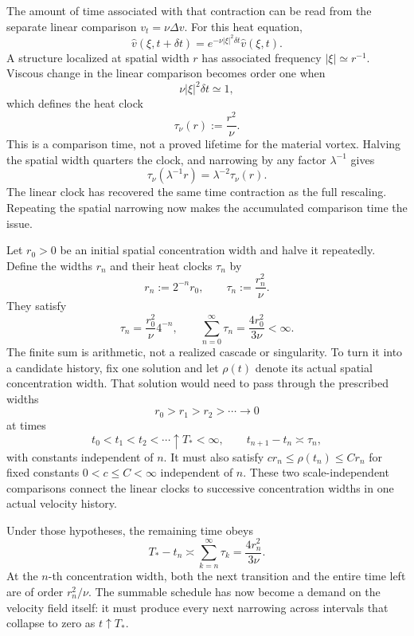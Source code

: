 
The amount of time associated with that contraction can be read from the separate linear comparison \(v_t=\nu\Delta v\). For this heat equation,
\[
  \widehat v(\xi,t+\delta t)
  =
  e^{-\nu|\xi|^2\delta t}\widehat v(\xi,t).
\]
A structure localized at spatial width \(r\) has associated frequency \(|\xi|\simeq r^{-1}\). Viscous change in the linear comparison becomes order one when
\[
  \nu|\xi|^2\delta t\simeq1,
\]
which defines the heat clock
\[
  \tau_\nu(r)
  :=
  \frac{r^2}{\nu}.
\]
This is a comparison time, not a proved lifetime for the material vortex. Halving the spatial width quarters the clock, and narrowing by any factor \(\lambda^{-1}\) gives
\[
  \tau_\nu(\lambda^{-1}r)
  =
  \lambda^{-2}\tau_\nu(r).
\]
The linear clock has recovered the same time contraction as the full \NavierStokes{} rescaling. Repeating the spatial narrowing now makes the accumulated comparison time the issue.


Let \(r_0>0\) be an initial spatial concentration width and halve it repeatedly. Define the widths \(r_n\) and their heat clocks \(\tau_n\) by
\[
  r_n:=2^{-n}r_0,
  \qquad
  \tau_n:=\frac{r_n^2}{\nu}.
\]
They satisfy
\[
  \tau_n
  =
  \frac{r_0^2}{\nu}4^{-n},
  \qquad
  \sum_{n=0}^{\infty}\tau_n
  =
  \frac{4r_0^2}{3\nu}
  <
  \infty.
\]
The finite sum is arithmetic, not a realized cascade or singularity. To turn it into a candidate history, fix one \NavierStokes{} solution and let \(\rho(t)\) denote its actual spatial concentration width. That solution would need to pass through the prescribed widths
\[
  r_0>r_1>r_2>\cdots\longrightarrow0
\]
at times
\[
  t_0<t_1<t_2<\cdots\uparrow T_*<\infty,
  \qquad
  t_{n+1}-t_n\asymp\tau_n,
\]
with constants independent of \(n\). It must also satisfy \(c r_n\leq\rho(t_n)\leq C r_n\) for fixed constants \(0<c\leq C<\infty\) independent of \(n\). These two scale-independent comparisons connect the linear clocks to successive concentration widths in one actual velocity history.

Under those hypotheses, the remaining time obeys
\[
  T_*-t_n
  \asymp
  \sum_{k=n}^{\infty}\tau_k
  =
  \frac{4r_n^2}{3\nu}.
\]
At the \(n\)-th concentration width, both the next transition and the entire time left are of order \(r_n^2/\nu\). The summable schedule has now become a demand on the velocity field itself: it must produce every next narrowing across intervals that collapse to zero as \(t\uparrow T_*\).
